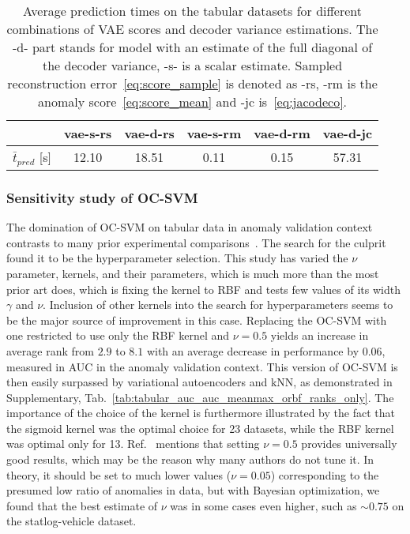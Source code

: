 \begin{table}
    \footnotesize
    \centering
    \tabcolsep=0.05cm
    \begin{tabular}{c|c c c c c}
         & vae-s-rs & vae-d-rs & vae-s-rm & vae-d-rm & vae-d-jc \\
         \midrule
        $\bar{t}_{pred}$ [s] & 12.10 & 18.51 & 0.11 & 0.15 & 57.31
    \end{tabular}
    \vspace*{0.15cm}
    \caption{Average prediction times on the  tabular datasets for different combinations of VAE scores and decoder variance estimations. The -d- part stands for model with an estimate of the full diagonal of the decoder variance, -s- is a scalar estimate. Sampled reconstruction error~\eqref{eq:score_sample} is denoted as -rs, -rm is the anomaly score~\eqref{eq:score_mean} and -jc is~\eqref{eq:jacodeco}.}
    \label{tab:predict_times}
\end{table}



\subsubsection{Sensitivity study of OC-SVM}
\label{sub:OC-SVM}
The domination of OC-SVM on tabular data in anomaly validation context contrasts to many prior experimental comparisons~\cite{goldstein2016comparative, chalapathyGroupAnomalyDetection2018, deecke2018image, gopalanPIDForestAnomalyDetection2019, iwataSupervisedAnomalyDetection2019, wang2020advae}. The search for the culprit found it to be the hyperparameter selection. This study has varied the $\nu$ parameter, kernels, and their parameters, which is much more than the most prior art does, which is fixing the kernel to RBF and tests few values of its width $\gamma$ and $\nu.$ Inclusion of other kernels into the search for hyperparameters seems to be the major source of improvement in this case. Replacing the OC-SVM with one restricted to use only the RBF kernel and $\nu=0.5$ yields an increase in average rank from $2.9$ to $8.1$ with an average decrease in performance by $0.06$, measured in AUC in the anomaly validation context. This version of OC-SVM is then easily surpassed by variational autoencoders and kNN, as demonstrated in Supplementary, Tab.~\ref{tab:tabular_auc_auc_meanmax_orbf_ranks_only}.  The importance of the choice of the kernel is furthermore illustrated by the fact that the sigmoid kernel was the optimal choice for 23 datasets, while the RBF kernel was optimal only for 13. Ref.~\cite{goldstein2016comparative} mentions that setting $\nu=0.5$ provides universally good results, which may be the reason why many authors do not tune it. In theory, it should be set to much lower values ($\nu = 0.05$) corresponding to the presumed low ratio of anomalies in data, but with Bayesian optimization, we found that the best estimate of $\nu$ was in some cases even higher, such as $\sim0.75$ on the statlog-vehicle dataset.

